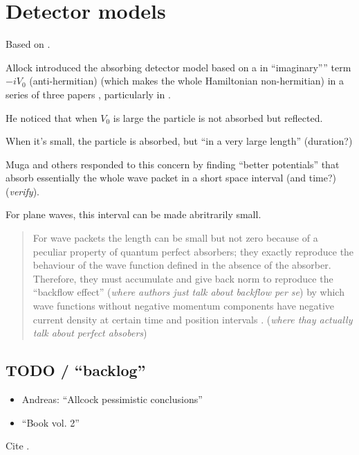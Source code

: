 \section{Detector models}

Based on \cite[sec. 1.4.3]{TQM1}.

Allock introduced the absorbing detector model based on a in ``imaginary'''' term $-iV_0$
(anti-hermitian) (which makes the whole Hamiltonian non-hermitian) in a series of three papers
\parencite{Allcock-1, Allcock-2, Allcock-3},
particularly in \cite[sec. II-IV]{Allcock-2}.

He noticed that when $V_0$ is large the particle is not absorbed but reflected.

When it's small, the particle is absorbed, but ``in a very large length'' (duration?)

Muga and others responded to this concern by finding ``better potentials'' that absorb essentially the
whole wave packet in a short space interval (and time?)
\parencite{Muga_TOAQM, Muga_CompositeAbsPot, ComplexAbsPot} (\emph{verify}).

For plane waves, this interval can be made abritrarily small.

\begin{quotation}
  For wave packets the length can be small but not zero because of a
  peculiar property of quantum perfect absorbers; they exactly reproduce
  the behaviour of the wave function defined in the absence of the absorber.
  Therefore, they must accumulate and give back norm to reproduce the
  ``backflow effect'' \parencite{Bracken_bf, Bracken_ProbTransport}
  (\emph{where authors just talk about backflow per se})
  by which wave functions without negative momentum components
  have negative current density at certain time and position intervals
  \parencite{Leavens_backflow}. (\emph{where thay actually talk about perfect absobers})
\end{quotation}

\subsection{TODO / ``backlog''}

\begin{itemize}
  \item Andreas: ``Allcock pessimistic conclusions''
  \item ``Book vol. 2'' \cite{TQM2:Detector}
\end{itemize}

Cite \cite{Muga_ArrTimeOpNormal, Damborenea, Sudarshan_Zeno, Echanobe, Savvidou-1, Savvidou-2}.

